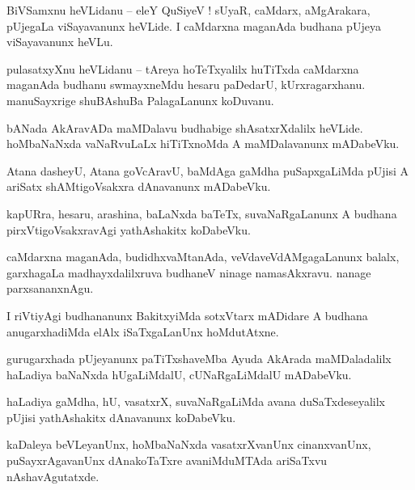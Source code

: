 \documentclass{article}
\begin{document}
\begin{mng}%
BiVSamxnu heVLidanu -- eleY QuSiyeV ! sUyaR, caMdarx, aMgArakara, pUjegaLa viSayavanunx heVLide. I 
caMdarxna maganAda budhana pUjeya viSayavanunx heVLu.
\end{mng}

\begin{mng}%
pulasatxyXnu heVLidanu -- tAreya hoTeTxyalilx huTiTxda caMdarxna maganAda budhanu swmayxneMdu 
hesaru paDedarU, kUrxragarxhanu. manuSayxrige shuBAshuBa PalagaLanunx koDuvanu.
\end{mng}

\begin{mng}%
bANada AkAravADa maMDalavu budhabige shAsatxrXdalilx heVLide. hoMbaNaNxda vaNaRvuLaLx hiTiTxnoMda 
A maMDalavanunx mADabeVku.
\end{mng}

\begin{mng}%
Atana dasheyU, Atana goVcAravU, baMdAga gaMdha puSapxgaLiMda pUjisi A ariSatx shAMtigoVsakxra 
dAnavanunx mADabeVku.
\end{mng}

\begin{mng}%
kapURra, hesaru, arashina, baLaNxda baTeTx, suvaNaRgaLanunx A budhana pirxVtigoVsakxravAgi 
yathAshakitx koDabeVku.
\end{mng}

\begin{mng}%
caMdarxna maganAda, budidhxvaMtanAda, veVdaveVdAMgagaLanunx balalx, garxhagaLa madhayxdalilxruva 
budhaneV ninage namasAkxravu. nanage parxsananxnAgu.
\end{mng}

\begin{mng}%
I riVtiyAgi budhananunx BakitxyiMda sotxVtarx mADidare A budhana anugarxhadiMda elAlx 
iSaTxgaLanUnx hoMdutAtxne.
\end{mng}

\begin{mng}%
gurugarxhada pUjeyanunx paTiTxshaveMba Ayuda AkArada maMDaladalilx haLadiya baNaNxda hUgaLiMdalU, 
cUNaRgaLiMdalU mADabeVku.
\end{mng}

\begin{mng}%
haLadiya gaMdha, hU, vasatxrX, suvaNaRgaLiMda avana duSaTxdeseyalilx pUjisi yathAshakitx 
dAnavanunx koDabeVku.
\end{mng}

\begin{mng}%
kaDaleya beVLeyanUnx, hoMbaNaNxda vasatxrXvanUnx cinanxvanUnx, puSayxrAgavanUnx dAnakoTaTxre 
avaniMduMTAda ariSaTxvu nAshavAgutatxde.
\end{mng}
\end{document}
